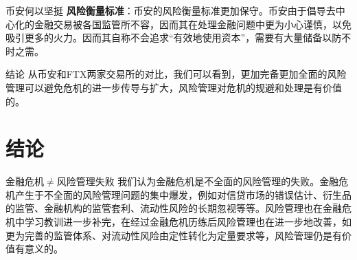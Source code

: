\begin{frame}{币安何以坚挺}
    \textbf{风险衡量标准}：币安的风险衡量标准更加保守。币安由于倡导去中心化的金融交易被各国监管所不容，因而其在处理金融问题中更为小心谨慎，以免吸引更多的火力。因而其自称不会追求“有效地使用资本”，需要有大量储备以防不时之需。
    \begin{block}{结论}
        从币安和FTX两家交易所的对比，我们可以看到，更加完备更加全面的风险管理可以避免危机的进一步传导与扩大，风险管理对危机的规避和处理是有价值的。
    \end{block}
\end{frame}


\section{结论}
\begin{frame}{金融危机$\ne$风险管理失败}
我们认为金融危机是不全面的风险管理的失败。金融危机产生于不全面的风险管理问题的集中爆发，例如对信贷市场的错误估计、衍生品的监管、金融机构的监管套利、流动性风险的长期忽视等等。风险管理也在金融危机中学习教训进一步补完，在经过金融危机历练后风险管理也在进一步地改善，如更为完善的监管体系、对流动性风险由定性转化为定量要求等，风险管理仍是有价值有意义的。
\end{frame}
